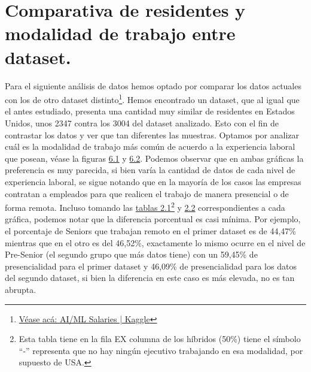 \documentclass{article}
\begin{document}
	\section{Comparativa de residentes y modalidad de trabajo entre dataset.}
	Para el siguiente análisis de datos hemos optado por comparar los datos actuales con los de otro dataset distinto\footnote{\href{https://www.kaggle.com/datasets/cedricaubin/ai-ml-salaries}{Véase acá: AI/ML Salaries | Kaggle}}. Hemos encontrado un dataset, que al igual que el antes estudiado, presenta una cantidad muy similar de residentes en Estados Unidos, unos 2347 contra los 3004 del dataset analizado. Esto con el fin de contrastar los datos y ver que tan diferentes las muestras.
	Optamos por analizar cuál es la modalidad de trabajo más común de acuerdo a la experiencia laboral que posean, véase la figuras \hyperref[figura6.1y6.2GraficoBarras]{6.1} y \hyperref[figura6.1y6.2GraficoBarras]{6.2}. 
	Podemos observar que en ambas gráficas la preferencia es muy parecida, si bien varía la cantidad de datos de cada nivel de experiencia laboral, se sigue notando que en la mayoría de los casos las empresas contratan a empleados para que realicen el trabajo de manera presencial o de forma remota. Incluso tomando las \hyperref[tablasDinamicas2.1y2.2]{tablas 2.1\footnote{Esta tabla tiene en la fila EX columna de los híbridos (50\%) tiene el símbolo “-” representa que no hay ningún ejecutivo trabajando en esa modalidad, por supuesto de USA.}} y \hyperref[tablasDinamicas2.1y2.2]{2.2} correspondientes a cada gráfica, podemos notar que la diferencia porcentual es casi mínima. Por ejemplo, el porcentaje de Seniors que trabajan remoto en el primer dataset es de 44,47\% mientras que en el otro es del 46,52\%, exactamente lo mismo ocurre en el nivel de Pre-Senior (el segundo grupo que más datos tiene) con un 59,45\% de presencialidad para el primer dataset y 46,09\% de presencialidad para los datos del segundo dataset, si bien la diferencia en este caso es más elevada, no es tan abrupta.
\end{document}
